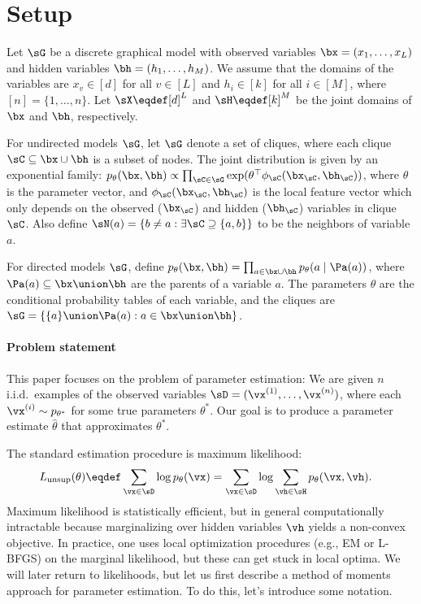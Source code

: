 \section{Setup}
\label{sec:setup}

Let $\sG$ be a discrete graphical model with
observed variables $\bx = (x_1, \dots, x_L)$ and
hidden variables $\bh = (h_{1}, \dots, h_M)$.
We assume that the domains of the variables
are $x_v \in [d]$ for all $v \in [L]$
and $h_i \in [k]$ for all $i \in [M]$,
where $[n] = \{ 1, \dots, n \}$.
Let $\sX \eqdef [d]^L$ and $\sH \eqdef [k]^{M}$ be the joint domains of $\bx$ and $\bh$, respectively.

For undirected models $\sG$,
let $\sG$ denote a set of cliques, where each clique $\sC \subseteq \bx \cup \bh$ is a subset of nodes.
The joint distribution is given by an exponential family:
  $p_\theta(\bx,\bh) \propto \prod_{\sC \in \sG} \exp(\theta^\top\phi_\sC(\bx_\sC, \bh_\sC))$,
  where $\theta$ is the parameter vector,
  and $\phi_\sC(\bx_\sC, \bh_\sC)$ is the local feature vector
  which only depends on the observed ($\bx_\sC$) and hidden ($\bh_\sC$) variables in clique $\sC$.
  Also define $\sN(a) = \{ b \neq a : \exists \sC \supseteq \{ a, b \} \}$ to be the neighbors of variable $a$.

For directed models $\sG$,
  define $p_\theta(\bx,\bh) = \prod_{a \in \bx \cup \bh} p_\theta(a \mid \Pa(a))$,
  where $\Pa(a) \subseteq \bx \union \bh$ are the parents of a variable $a$.
  The parameters $\theta$ are the conditional probability tables of each variable,
  and the cliques are $\sG = \{ \{ a \} \union \Pa(a) : a \in \bx \union \bh \}$.

\paragraph{Problem statement}

This paper focuses on the problem of parameter estimation:
We are given $n$ i.i.d.~examples of the observed variables $\sD
  = (\vx^{(1)}, \dots, \vx^{(n)})$, where each $\vx^{(i)} \sim p_{\theta^*}$ for
  some true parameters $\theta^*$.
Our goal is to produce a parameter estimate $\hat\theta$ that
  approximates $\theta^*$.

The standard estimation procedure is maximum likelihood:
  \begin{align}
    \label{eqn:unsup}
    L_\text{unsup}(\theta) &\eqdef \sum_{\vx \in \sD} \log p_\theta(\vx)
        =  \sum_{\vx \in \sD} \log \sum_{\vh \in \sH} p_\theta(\vx,\vh).
  \end{align}
  Maximum likelihood is statistically efficient,
  but in general computationally intractable
  because marginalizing over hidden variables $\vh$ yields a non-convex objective.
In practice, one uses local optimization procedures (e.g., EM
  or L-BFGS) on the marginal likelihood, but these can get stuck in local
  optima.
We will later return to likelihoods, but let us first
describe a method of moments approach for parameter estimation.
To do this, let's introduce some notation.

